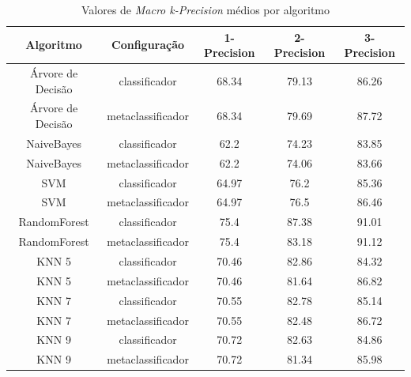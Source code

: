 \begin{table}[h!]
  \begin{center}
    \resizebox{\textwidth}{!} {
    \begin{tabular}{ccccc}
      \hline
      \textbf{Algoritmo} & \textbf{Configuração} & \textbf{1-Precision} & \textbf{2-Precision} & \textbf{3-Precision}\\
      \hline

Árvore de Decisão	&	classificador	&	68.34	&	79.13	&	86.26	\\
Árvore de Decisão	&	metaclassificador	&	68.34	&	79.69	&	87.72	\\
NaiveBayes	&	classificador	&	62.2	&	74.23	&	83.85	\\
NaiveBayes	&	metaclassificador	&	62.2	&	74.06	&	83.66	\\
SVM	&	classificador	&	64.97	&	76.2	&	85.36	\\
SVM	&	metaclassificador	&	64.97	&	76.5	&	86.46	\\
RandomForest	&	classificador	&	75.4	&	87.38	&	91.01	\\
RandomForest	&	metaclassificador	&	75.4	&	83.18	&	91.12	\\
KNN 5	&	classificador	&	70.46	&	82.86	&	84.32	\\
KNN 5	&	metaclassificador	&	70.46	&	81.64	&	86.82	\\
KNN 7	&	classificador	&	70.55	&	82.78	&	85.14	\\
KNN 7	&	metaclassificador	&	70.55	&	82.48	&	86.72	\\
KNN 9	&	classificador	&	70.72	&	82.63	&	84.86	\\
KNN 9	&	metaclassificador	&	70.72	&	81.34	&	85.98	\\

      \hline
    \end{tabular}
    }
    \caption{Valores de \textit{Macro k-Precision} médios por algoritmo}
    \label{tab:prec}
  \end{center}
\end{table}

